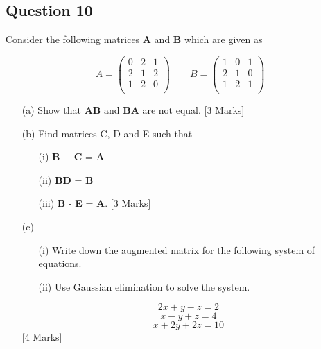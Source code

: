 
\newpage

\subsection*{Question 10}
Consider the following matrices \textbf{A} and \textbf{B} which are given as


\[ A = \left(
  \begin{array}{ccc}
0 & 2 & 1 \\
2 &1 &2\\
1 &2 &0\\
  \end{array}
\right) \qquad
B = \left(
\begin{array}{ccc}
1 &0 &1\\
2 &1 &0\\
1 &2 &1\\
\end{array}
\right)
\]

\begin{itemize}
\item[(a)] Show that \textbf{AB} and \textbf{BA} are not equal. [3 Marks]
\item[(b)] Find matrices C, D and E such that
\begin{itemize}
\item[(i)] \textbf{B} + \textbf{C} = \textbf{A}
\item[(ii)] \textbf{BD} = \textbf{B}
\item[(iii)] \textbf{B} - \textbf{E} = \textbf{A}. [3 Marks]
\end{itemize}


\item[(c)]

\begin{itemize}
\item[(i)] Write down the augmented matrix for the following system of equations.
\item[(ii)] Use Gaussian elimination to solve the system. 
\end{itemize}
\[2x + y - z = 2\]
\[x - y + z = 4\]
\[x + 2y + 2z = 10\]
[4 Marks]
\end{itemize}

